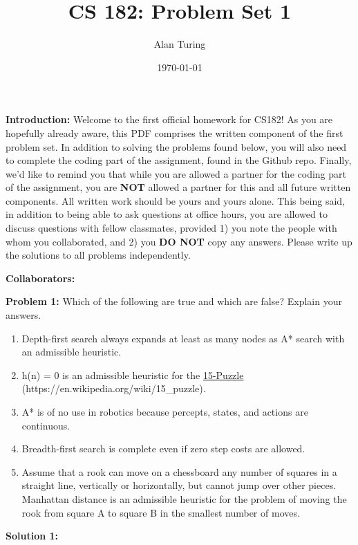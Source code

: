 \documentclass[]{article}
\title{CS 182: Problem Set 1}
\author{Alan Turing}
\date{\today}
\begin{document}
\maketitle

\textbf{Introduction:}  
Welcome to the first official homework for CS182!  As you are hopefully already aware, this PDF comprises the written component of the first problem set.  In addition to solving the problems found below, you will also need to complete the coding part of the assignment, found in the Github repo.  Finally, we'd like to remind you that while you are allowed a partner for the coding part of the assignment, you are \textbf{NOT} allowed a partner for this and all future written components.  All written work should be yours and yours alone.  This being said, in addition to being able to ask questions at office hours, you are allowed to discuss questions with fellow classmates, provided 1) you note the people with whom you collaborated, and 2) you \textbf{DO NOT} copy any answers.  Please write up the solutions to all problems independently.

\bigskip
\textbf{Collaborators:}

\clearpage

\textbf{Problem 1:}
Which of the following are true and which are false? Explain your answers.

\begin{enumerate}[label=(\alph*)]
    \item Depth-first search always expands at least as many nodes as A* search with an admissible heuristic.
    \item h(n) = 0 is an admissible heuristic for the \href{https://en.wikipedia.org/wiki/15_puzzle}{15-Puzzle} (https://en.wikipedia.org/wiki/15\_puzzle).
    \item A* is of no use in robotics because percepts, states, and actions are continuous.
    \item Breadth-first search is complete even if zero step costs are allowed.
    \item Assume that a rook can move on a chessboard any number of squares in a straight line, vertically or horizontally, but cannot jump over other pieces. Manhattan distance is an admissible heuristic for the problem of moving the rook from square A to square B in the smallest number of moves.
\end{enumerate}

\bigskip

\textbf{Solution 1:}
\end{document}
